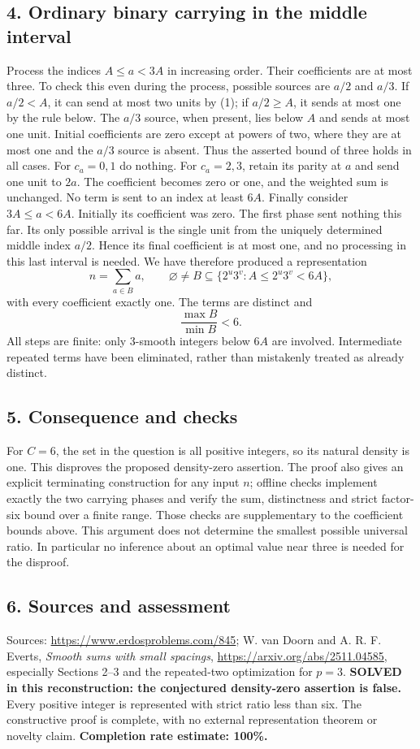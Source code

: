 \subsection*{4. Ordinary binary carrying in the middle interval}
Process the indices $A\le a<3A$ in increasing order. Their coefficients are at most three. To check this even during the process, possible sources are $a/2$ and $a/3$. If $a/2<A$, it can send at most two units by (1); if $a/2\ge A$, it sends at most one by the rule below. The $a/3$ source, when present, lies below $A$ and sends at most one unit. Initial coefficients are zero except at powers of two, where they are at most one and the $a/3$ source is absent. Thus the asserted bound of three holds in all cases.
For $c_a=0,1$ do nothing. For $c_a=2,3$, retain its parity at $a$ and send one unit to $2a$. The coefficient becomes zero or one, and the weighted sum is unchanged. No term is sent to an index at least $6A$.
Finally consider $3A\le a<6A$. Initially its coefficient was zero. The first phase sent nothing this far. Its only possible arrival is the single unit from the uniquely determined middle index $a/2$. Hence its final coefficient is at most one, and no processing in this last interval is needed.
We have therefore produced a representation
\[
 n=\sum_{a\in B}a,\qquad
 \varnothing\ne B\subseteq\{2^u3^v:A\le2^u3^v<6A\},
\]
with every coefficient exactly one. The terms are distinct and
\[
 \frac{\max B}{\min B}<6.
\]
All steps are finite: only 3-smooth integers below $6A$ are involved. Intermediate repeated terms have been eliminated, rather than mistakenly treated as already distinct.
\subsection*{5. Consequence and checks}
For $C=6$, the set in the question is all positive integers, so its natural density is one. This disproves the proposed density-zero assertion. The proof also gives an explicit terminating construction for any input $n$; offline checks implement exactly the two carrying phases and verify the sum, distinctness and strict factor-six bound over a finite range. Those checks are supplementary to the coefficient bounds above.
This argument does not determine the smallest possible universal ratio. In particular no inference about an optimal value near three is needed for the disproof.
\subsection*{6. Sources and assessment}
Sources: \url{https://www.erdosproblems.com/845}; W. van Doorn and A. R. F. Everts, \emph{Smooth sums with small spacings}, \url{https://arxiv.org/abs/2511.04585}, especially Sections 2--3 and the repeated-two optimization for $p=3$.
\textbf{SOLVED in this reconstruction: the conjectured density-zero assertion is false.} Every positive integer is represented with strict ratio less than six. The constructive proof is complete, with no external representation theorem or novelty claim.
\textbf{Completion rate estimate: 100\%.}
